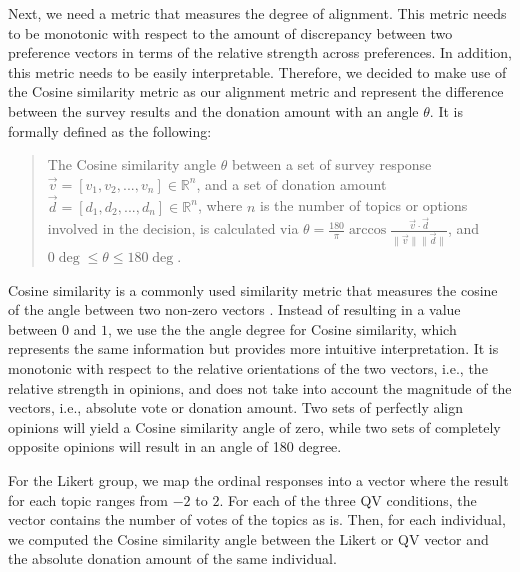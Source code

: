Next, we need a metric that measures the degree of alignment. This metric needs to be monotonic with respect to the amount of discrepancy between two preference vectors in terms of the relative strength across preferences. In addition, this metric needs to be easily interpretable. Therefore, we decided to make use of the Cosine similarity metric as our alignment metric and represent the difference between the survey results and the donation amount with an angle $\theta$. It is formally defined as the following:

\begin{quote}
    The Cosine similarity angle $\theta$ between a set of survey response $\vec{v} = [v_1, v_2, ..., v_n] \in \mathbb{R}^n$, and a set of donation amount $\vec{d} = [d_1, d_2, ..., d_n] \in \mathbb{R}^n$, where $n$ is the number of topics or options involved in the decision, is calculated via $\theta = \frac{180}{\pi} \arccos{\frac{\vec{v} \cdot \vec{d}}{\|\vec{v}\| \|\vec{d}\|}}$, and $0\deg \leq \theta \leq 180\deg$.
\end{quote}

Cosine similarity is a commonly used similarity metric 
that measures the cosine of the angle between two non-zero vectors \cite{singhal2001modern}. Instead of resulting in a value between $0$ and $1$, we use the the angle degree for Cosine similarity, which represents the same information but provides more intuitive interpretation.
It is monotonic with respect to the relative orientations of the two vectors, i.e., the relative strength in opinions, and does not take into account the magnitude of the vectors, i.e., absolute vote or donation amount. Two sets of perfectly align opinions 
will yield a Cosine similarity angle of zero, while two sets of completely opposite opinions will result in an angle of 180 degree.

For the Likert group, we map the ordinal responses into a vector where the result for each topic ranges from $-2$ to $2$. For each of the three QV conditions, the vector contains the number of votes of the topics as is. Then, for each individual, we computed the Cosine similarity angle between the Likert or QV vector and the absolute donation amount of the same individual. 

